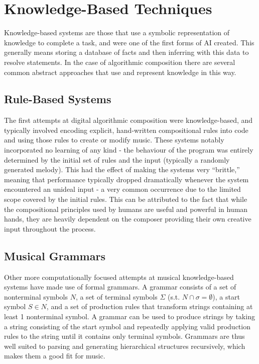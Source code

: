 \documentclass[ author={Stephen Livermore-Tozer},
				supervisor={Dr. Peter Flach},
				degree={MEng},
				title={Performing Algorithmic Co-composition Using Machine Learning},
				subtitle={},
				type={research},
				year={2016} ]{dissertation}
\begin{document}
	\section{Knowledge-Based Techniques}
	\label{sec:knowledge-techniques}
	
	Knowledge-based systems are those that use a symbolic representation of knowledge to complete a task, and were one of the first forms of AI created. This generally means storing a database of facts and then inferring with this data to resolve statements. In the case of algorithmic composition there are several common abstract approaches that use and represent knowledge in this way. 
	
	\subsection{Rule-Based Systems}
	
	The first attempts at digital algorithmic composition were knowledge-based, and typically involved encoding explicit, hand-written compositional rules into code and using those rules to create or modify music. These systems notably incorporated no learning of any kind - the behaviour of the program was entirely determined by the initial set of rules and the input (typically a randomly generated melody). This had the effect of making the systems very ``brittle,'' meaning that performance typically dropped dramatically whenever the system encountered an unideal input - a very common occurrence due to the limited scope covered by the initial rules. This can be attributed to the fact that while the compositional principles used by humans are useful and powerful in human hands, they are heavily dependent on the composer providing their own creative input throughout the process.
	
	\subsection{Musical Grammars}
	
	Other more computationally focused attempts at musical knowledge-based systems have made use of formal grammars. A grammar consists of a set of nonterminal symbols $N$, a set of terminal symbols $\Sigma$ (s.t. $N \cap \sigma = \emptyset$), a start symbol $S \in N$, and a set of production rules that transform strings containing at least 1 nonterminal symbol. A grammar can be used to produce strings by taking a string consisting of the start symbol and repeatedly applying valid production rules to the string until it contains only terminal symbols. Grammars are thus well suited to parsing and generating hierarchical structures recursively, which makes them a good fit for music. 
	
\end{document}
